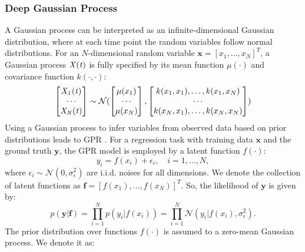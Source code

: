 \subsubsection{Deep Gaussian Process}
A Gaussian process can be interpreted as an infinite-dimensional Gaussian distribution, where at each time point the random variables follow normal distributions. For an $N$-dimensional random variable $\boldsymbol{x}=[x_1,\dots,x_N]^T$, a Gaussian process $\it{X}(t)$ is fully specified by its mean function $\mu(\cdot)$ and covariance function $k(\cdot, \cdot)$:
\begin{equation}
     \begin{bmatrix} \it{X}_1(t) \\ \cdots \\\it{X}_N(t) \end{bmatrix}\sim\mathcal{N}( \begin{bmatrix} \mu(x_1) \\ \cdots \\\mu(x_N) \end{bmatrix},  \begin{bmatrix} k(x_1,x_1),\dots,k(x_1, x_N) \\ \cdots \\k(x_N,x_1), \dots,k(x_N, x_N) \end{bmatrix})
\end{equation}
Using a Gaussian process to infer variables from observed data based on prior distributions leads to \ac{GPR} \citep{Rasmussen_Williams_2008}. For a regression task with training data $\boldsymbol{x}$ and the ground truth $\boldsymbol{y}$, the \ac{GPR} model is employed by a latent function $f(\cdot)$:
\begin{equation}
    \label{eq:simgp}
    y_i = f(x_i) + \epsilon_i,\quad i=1,\dots,N,
\end{equation}
where $\epsilon_i \sim \mathcal{N}(0, \sigma_\epsilon^2)$ are \ac{i.i.d.} noises for all dimensions. We denote the collection of latent functions as $\boldsymbol{f}=[f(x_1), \dots, f(x_N)]^T$. So, the likelihood of $\boldsymbol{y}$ is given by:
\begin{equation}
    p(\boldsymbol{y}|\boldsymbol{f}) = \prod_{i=1}^{N}p(y_i|f(x_i)) = \prod_{i=1}^{N}\mathcal{N}(y_i|f(x_i), \sigma_\epsilon^2).    
\end{equation}                                                                                                                          
The prior distribution over functions $f(\cdot)$ is assumed to a zero-mean Gaussian process. We denote it as:

